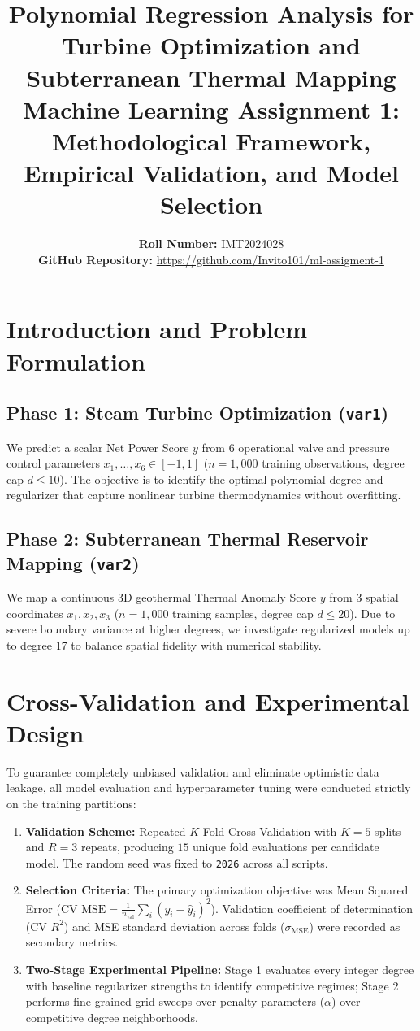 \documentclass[10pt,a4paper]{article}
\title{\vspace{-1.2em}\textbf{\LARGE Polynomial Regression Analysis for Turbine Optimization and Subterranean Thermal Mapping}\\[0.25em]
\large Machine Learning Assignment 1: Methodological Framework, Empirical Validation, and Model Selection\vspace{-0.5em}}
\author{\textbf{Roll Number:} IMT2024028\\[0.2em]
\textbf{GitHub Repository:} \url{https://github.com/Invito101/ml-assigment-1}}
\date{\vspace{-1.2em}}
\begin{document}
\maketitle

\section{Introduction and Problem Formulation}

\subsection{Phase 1: Steam Turbine Optimization (\texttt{var1})}
We predict a scalar Net Power Score $y$ from 6 operational valve and pressure control parameters $x_1, \ldots, x_6 \in [-1, 1]$ ($n=1{,}000$ training observations, degree cap $d \le 10$). The objective is to identify the optimal polynomial degree and regularizer that capture nonlinear turbine thermodynamics without overfitting.

\subsection{Phase 2: Subterranean Thermal Reservoir Mapping (\texttt{var2})}
We map a continuous 3D geothermal Thermal Anomaly Score $y$ from 3 spatial coordinates $x_1, x_2, x_3$ ($n=1{,}000$ training samples, degree cap $d \le 20$). Due to severe boundary variance at higher degrees, we investigate regularized models up to degree 17 to balance spatial fidelity with numerical stability.

\section{Cross-Validation and Experimental Design}
To guarantee completely unbiased validation and eliminate optimistic data leakage, all model evaluation and hyperparameter tuning were conducted strictly on the training partitions:
\begin{enumerate}
    \item \textbf{Validation Scheme:} Repeated $K$-Fold Cross-Validation with $K = 5$ splits and $R = 3$ repeats, producing $15$ unique fold evaluations per candidate model. The random seed was fixed to \texttt{2026} across all scripts.
    \item \textbf{Selection Criteria:} The primary optimization objective was Mean Squared Error ($\text{CV MSE} = \frac{1}{n_{\text{val}}} \sum_{i} (y_i - \hat{y}_i)^2$). Validation coefficient of determination ($\text{CV } R^2$) and MSE standard deviation across folds ($\sigma_{\text{MSE}}$) were recorded as secondary metrics.
    \item \textbf{Two-Stage Experimental Pipeline:} Stage 1 evaluates every integer degree with baseline regularizer strengths to identify competitive regimes; Stage 2 performs fine-grained grid sweeps over penalty parameters ($\alpha$) over competitive degree neighborhoods.
\end{enumerate}
\end{document}

